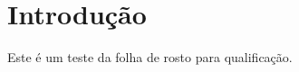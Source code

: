 \documentclass[mestrado,qualificacao]{UnB-PPGT}
\begin{document}
\maketitle

\textual

\chapter{Introdução}
Este é um teste da folha de rosto para qualificação.
\end{document}
